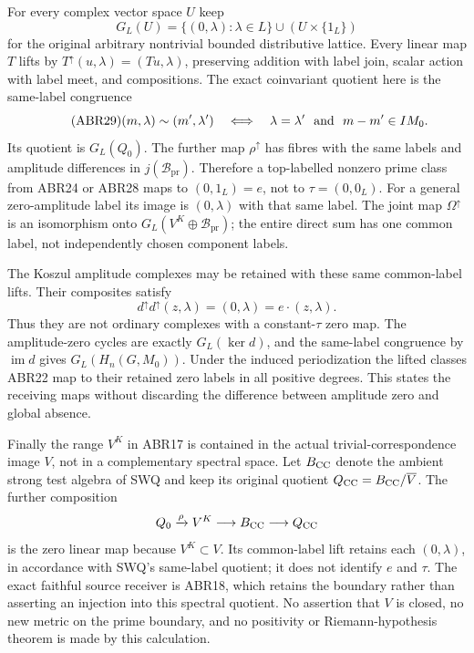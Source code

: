 For every complex vector space $U$ keep
\[
 G_L(U)=\{(0,\lambda):\lambda\in L\}\cup(U\times\{1_L\})
\]
for the original arbitrary nontrivial bounded distributive lattice.
Every linear map $T$ lifts by
$T^\uparrow(u,\lambda)=(Tu,\lambda)$, preserving addition with
label join, scalar action with label meet, and compositions.
The exact coinvariant quotient here is the same-label congruence
\begin{equation}\tag{ABR29}
 (m,\lambda)\sim(m',\lambda')
 \quad\Longleftrightarrow\quad
 \lambda=\lambda'\ \hbox{ and }\ m-m'\in IM_0.
\end{equation}
Its quotient is $G_L(Q_0)$. The further map $\rho^\uparrow$ has
fibres with the same labels and amplitude differences in
$j(\mathcal B_{\mathrm{pr}})$. Therefore a top-labelled nonzero
prime class from ABR24 or ABR28 maps to $(0,1_L)=e$, not
to $\tau=(0,0_L)$. For a general zero-amplitude label its image
is $(0,\lambda)$ with that same label. The joint map
$\Omega^\uparrow$ is an isomorphism onto
$G_L(V^K\oplus\mathcal B_{\mathrm{pr}})$; the entire direct sum
has one common label, not independently chosen component labels.

The Koszul amplitude complexes may be retained with these same
common-label lifts. Their composites satisfy
\begin{equation}\tag{ABR30}
 d^\uparrow d^\uparrow(z,\lambda)=(0,\lambda)
                                  =e\cdot(z,\lambda).
\end{equation}
Thus they are not ordinary complexes with a constant-$\tau$
zero map. The amplitude-zero cycles are exactly $G_L(\ker d)$,
and the same-label congruence by $\operatorname{im}d$ gives
$G_L(H_n(G,M_0))$. Under the induced periodization the lifted
classes ABR22 map to their retained zero labels in all positive
degrees. This states the receiving maps without discarding the
difference between amplitude zero and global absence.

Finally the range $V^K$ in ABR17 is contained in the actual
trivial-correspondence image $V$, not in a complementary spectral
space. Let $B_{\rm CC}$ denote the ambient strong test algebra
of SWQ and keep its original quotient
$Q_{\rm CC}=B_{\rm CC}/\overline V$. The further composition
\[
 Q_0\xrightarrow{\rho}V^K\longrightarrow B_{\rm CC}
                            \longrightarrow Q_{\rm CC}
\]
is the zero linear map because $V^K\subset V$. Its common-label
lift retains each $(0,\lambda)$, in accordance with SWQ's
same-label quotient; it does not identify $e$ and $\tau$.
The exact faithful source receiver is ABR18, which retains the
boundary rather than asserting an injection into this spectral
quotient. No assertion that $V$ is closed, no new metric on the
prime boundary, and no positivity or Riemann-hypothesis theorem
is made by this calculation.
